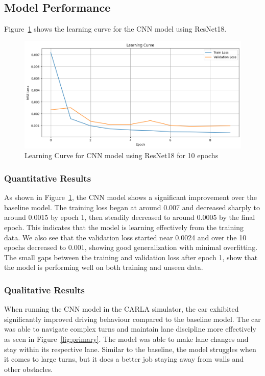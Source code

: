 \documentclass{article} %
\begin{document}
\subsection{Model Performance}

Figure~\ref{fig:learningCurveforCNN} shows the learning curve for the CNN model using ResNet18. 


\begin{figure}[H] %
    \centering
    \includegraphics[width=1.0\textwidth]{learningCurveforCNN.png} %
    \caption{Learning Curve for CNN model using ResNet18 for 10 epochs}
    \label{fig:learningCurveforCNN}
\end{figure}

\subsubsection{Quantitative Results}

As shown in Figure~\ref{fig:learningCurveforCNN}, the CNN model shows a significant improvement over the baseline model. 
The training loss began at around 0.007 and decreased sharply to around 0.0015 by epoch 1, then steadily decreased to around 0.0005 by the final 
epoch. This indicates that the model is learning effectively from the training data. 
We also see that the validation loss started near 0.0024 and over the 10 epochs decreased to 0.001, showing good generalization with minimal overfitting.
The small gaps between the training and validation loss after epoch 1, show that the model is performing well on both training and unseen data.


\subsubsection{Qualitative Results}

When running the CNN model in the CARLA simulator, the car exhibited significantly improved driving behaviour compared to the baseline model. 
The car was able to navigate complex turns and maintain lane discipline more effectively as seen in Figure~\ref{fig:primary}. The model was able to make lane changes and stay within its respective lane.
Similar to the baseline, the model struggles when it comes to large turns, but it does a better job staying away from walls and other obstacles.
\end{document}

